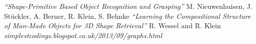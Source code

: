 \documentclass[12pt,oneside]{amsart}
\begin{document}
\begin{thebibliography}{1}
   \emph{“Shape-Primitive Based Object Recognition and Grasping”} M. Nieuwenhuisen, J. Stückler, A. Berner, R. Klein, S. Behnke
   \emph{“Learning the Compositional Structure of Man-Made Objects for 3D Shape Retrieval”} R. Wessel and R. Klein
   \emph{simplestcodings.blogspot.co.uk/2013/09/graphs.html}
\end{thebibliography}
\end{document}
